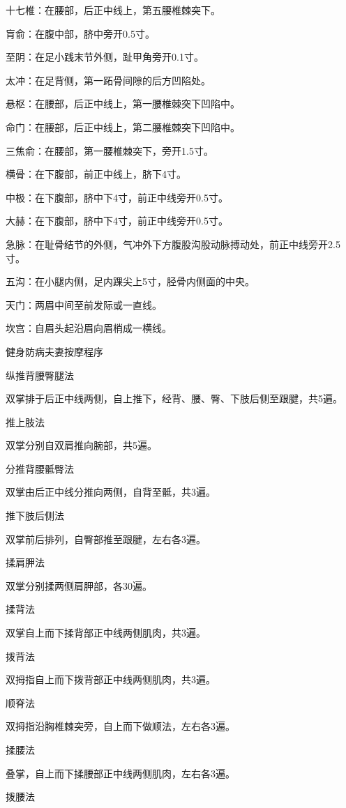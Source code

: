 \documentclass[12pt,UTF8,openany]{ctexbook}
\begin{document}
十七椎：在腰部，后正中线上，第五腰椎棘突下。

肓俞：在腹中部，脐中旁开0.5寸。

至阴：在足小践末节外侧，趾甲角旁开0.1寸。

太冲：在足背侧，第一跖骨间隙的后方凹陷处。

悬枢：在腰部，后正中线上，第一腰椎棘突下凹陷中。

命门：在腰部，后正中线上，第二腰椎棘突下凹陷中。

三焦俞：在腰部，第一腰椎棘突下，旁开1.5寸。

横骨：在下腹部，前正中线上，脐下4寸。

中极：在下腹部，脐中下4寸，前正中线旁开0.5寸。

大赫：在下腹部，脐中下4寸，前正中线旁开0.5寸。

急脉：在耻骨结节的外侧，气冲外下方腹股沟股动脉搏动处，前正中线旁开2.5寸。

五沟：在小腿内侧，足内踝尖上5寸，胫骨内侧面的中央。

天门：两眉中间至前发际或一直线。

坎宫：自眉头起沿眉向眉梢成一横线。





健身防病夫妻按摩程序


纵推背腰臀腿法

双掌排于后正中线两侧，自上推下，经背、腰、臀、下肢后侧至跟腱，共5遍。

推上肢法

双掌分别自双肩推向腕部，共5遍。

分推背腰骶臀法

双掌由后正中线分推向两侧，自背至骶，共3遍。

推下肢后侧法

双掌前后排列，自臀部推至跟腱，左右各3遍。

揉肩胛法

双掌分别揉两侧肩胛部，各30遍。

揉背法

双掌自上而下揉背部正中线两侧肌肉，共3遍。

拨背法

双拇指自上而下拨背部正中线两侧肌肉，共3遍。

顺脊法

双拇指沿胸椎棘突旁，自上而下做顺法，左右各3遍。

揉腰法

叠掌，自上而下揉腰部正中线两侧肌肉，左右各3遍。

拨腰法
\end{document}
